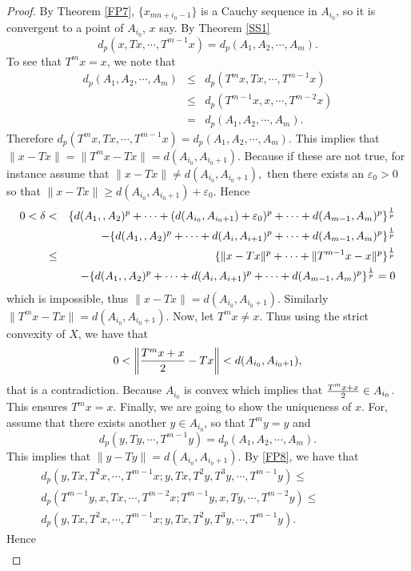 \documentclass{amsart}
\theoremstyle{definition}
\theoremstyle{remark}
\begin{document}
\begin{proof}
By Theorem \ref{FP7}, $\{x_{mn+i_0-1}\}$ is a Cauchy sequence in $A_{i_0}$, so it is convergent to a point of $A_{i_0}$, $x$ say. By Theorem \ref{SS1} $$d_p(x,Tx,\cdots,T^{m-1}x)=d_p(A_1,A_2,\cdots,A_m).$$ To see that $T^mx=x$, we note that
\begin{eqnarray*}d_p(A_1,A_2,\cdots,A_m)&\leq& d_p(T^mx,Tx,\cdots,T^{m-1}x)\\&\leq&d_p(T^{m-1}x,x,\cdots,T^{m-2}x)\\&=&d_p(A_1,A_2,\cdots,A_m).\end{eqnarray*}Therefore $d_p(T^mx,Tx,\cdots,T^{m-1}x)=d_p(A_1,A_2,\cdots,A_m)$. This implies that $\|x-Tx\|=\|T^mx-Tx\|=d(A_{i_0},A_{i_0+1}).$ Because if these are not true, for instance assume that $\|x-Tx\|\neq d(A_{i_0},A_{i_0+1}),$ then there exists an $\varepsilon_0>0$ so that $\|x-Tx\|\geq d(A_{i_0},A_{i_0+1})+\varepsilon_0$. Hence
\begin{eqnarray*}
0<\delta&<&\{d(A_1,,A_2)^p+\cdots+(d(A_{i_0},A_{i_0+1})+\varepsilon_0)^p+\cdots+d(A_{m-1},A_m)^p\}^{1\over p}\\&&-\{d(A_1,,A_2)^p+\cdots+d(A_{i},A_{i+1})^p+\cdots+d(A_{m-1},A_m)^p\}^{1\over p}\\
&\leq&\{\|x-Tx\|^p+\cdots+\|T^{m-1}x-x\|^p\}^{1\over p}\\&&-\{d(A_1,,A_2)^p+\cdots+d(A_{i},A_{i+1})^p+\cdots+d(A_{m-1},A_m)^p\}^{1\over p}=0
\end{eqnarray*} which is impossible, thus $\|x-Tx\|=d(A_{i_0},A_{i_0+1}).$ Similarly $\|T^mx-Tx\|=d(A_{i_0},A_{i_0+1}).$ Now, let $T^mx\neq x$. Thus using the strict convexity of $X$, we have that
$$0<\left\|{{T^mx+x}\over{2}}-Tx\right\|<d(A_{i_0},A_{i_0+1}),$$ that is a contradiction. Because $A_{i_0}$ is convex which implies that ${{T^mx+x}\over{2}}\in A_{i_0}$. This ensures $T^mx=x$. Finally, we are going to show the uniqueness of $x$. For, assume that there exists another $y\in A_{i_0}$, so that $T^my=y$ and
$$d_p(y,Ty,\cdots,T^{m-1}y)=d_p(A_1,A_2,\cdots,A_m).$$This implies that $\|y-Ty\|=d(A_{i_0},A_{i_0+1}).$
By \eqref{FP8}, we have that
\begin{eqnarray*}
d_p(y,Tx,T^2x,\cdots,T^{m-1}x;y,Tx,T^2y,T^3y,\cdots,T^{m-1}y)\leq\qquad\qquad\qquad\\ d_p(T^{m-1}y,x,Tx,\cdots,T^{m-2}x;T^{m-1}y,x,Ty,\cdots,T^{m-2}y)\leq\qquad\qquad\\ d_p(y,Tx,T^2x,\cdots,T^{m-1}x;y,Tx,T^2y,T^3y,\cdots,T^{m-1}y).\;\;\;\;\;\;\;
\end{eqnarray*}
Hence
\begin{eqnarray*}

\end{eqnarray*}
\end{proof}
\end{document}
